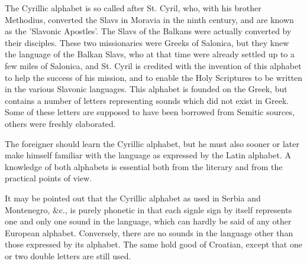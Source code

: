         The Cyrillic alphabet is so called after St. Cyril, who, with his brother
        Methodius, converted the Slavs in Moravia in the ninth century, and are known
        as the 'Slavonic Apostles'. The Slavs of the Balkans were actually converted by
        their disciples. These two missionaries were Greeks of Salonica, but
        they knew the language of the Balkan Slavs, who at that time were
        already settled up to a few miles of Salonica, and St. Cyril
        is credited with the invention of this alphabet to help the success of his
        mission, and to enable the Holy Scriptures to be written in the various
        Slavonic languages. This alphabet is founded on the Greek, but contains a
        number of letters representing sounds which did not exist in Greek. Some of
        these letters are supposed to have been borrowed from Semitic sources, others
        were freshly elaborated.

        The foreigner should learn the Cyrillic alphabet, but he must also
        sooner or later make himself familiar with the language as expressed by
        the Latin alphabet. A knowledge of both alphabets is essential both
        from the literary and from the practical points of view.
        
        It may be pointed out that the Cyrillic alphabet as used in Serbia and
        Montenegro, \&c., is purely phonetic in that each signle sign by itself
        represents one and only one sound in the language, which can hardly be said of
        any other European alphabet. Conversely, there are no sounds in the language
        other than those expressed by its alphabet. The same hold good of Croatian,
        except that one or two double letters are still used.
